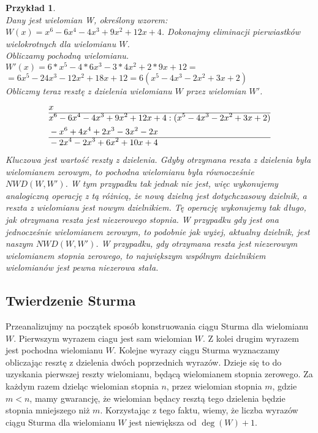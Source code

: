 \documentclass[oneside,a4paper]{book}
\newtheorem{example}{Przykład}
\begin{document}
	\begin{example}
		$ $ \\
		Dany jest wielomian W, określony wzorem: $W(x)=x^6-6x^4-4x^3+9x^2+12x+4$. Dokonajmy eliminacji pierwiastków wielokrotnych dla wielomianu $W$. \\
		Obliczamy pochodną wielomianu. \\
		$W'(x)=6*x^5-4*6x^3-3*4x^2+2*9x+12=$ \\
		$=6x^5-24x^3-12x^2+18x+12=6(x^5-4x^3-2x^2+3x+2)$ \\
		Obliczmy teraz resztę z dzielenia wielomianu $W$ przez wielomian $W'$.
		\begin{equation}
		\begin{split}
		&x\\\hline
		&x^6-6x^4-4x^3+9x^2+12x+4 : (x^5-4x^3-2x^2+3x+2) \\
		&-x^6+4x^4+2x^3-3x^2-2x \\\hline
		&-2x^4-2x^3+6x^2+10x+4 \\
		\end{split}
		\end{equation}
		Kluczowa jest wartość reszty z dzielenia. Gdyby otrzymana reszta z dzielenia była wielomianem zerowym, to pochodna wielomianu była równocześnie $NWD(W, W')$. W tym przypadku tak jednak nie jest, więc wykonujemy analogiczną operację z tą różnicą, że nową dzielną jest dotychczasowy dzielnik, a reszta z wielomianu jest nowym dzielnikiem. Tę operację wykonujemy tak długo, jak otrzymana reszta jest niezerowego stopnia. W przypadku gdy jest ona jednocześnie wielomianem zerowym, to podobnie jak wyżej, aktualny dzielnik, jest naszym $NWD(W, W')$. W przypadku, gdy otrzymana reszta jest niezerowym wielomianem stopnia zerowego, to największym wspólnym dzielnikiem wielomianów jest pewna niezerowa stała.
	\end{example}
	
	\subsection{Twierdzenie Sturma}
	
	Przeanalizujmy na początek sposób konstruowania ciągu Sturma dla wielomianu $W$. Pierwszym wyrazem ciagu jest sam wielomian $W$. Z kolei drugim wyrazem jest pochodna wielomianu $W$. Kolejne wyrazy ciągu Sturma wyznaczamy obliczając resztę z dzielenia dwóch poprzednich wyrazów. Dzieje się to do uzyskania pierwszej reszty wielomianu, będącą wielomianem stopnia zerowego. Za każdym razem dzieląc wielomian stopnia $n$, przez wielomian stopnia $m$, gdzie $m<n$, mamy gwarancję, że wielomian będacy resztą tego dzielenia będzie stopnia mniejszego niż $m$. Korzystając z tego faktu, wiemy, że liczba wyrazów ciągu Sturma dla wielomianu $W$ jest niewiększa od $\deg(W)+1$.
	
\end{document}
